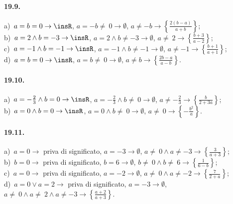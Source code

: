 \paragraph{19.9.}
a)~$a=b=0 \rightarrow \insR$, $a=-b\neq~0 \rightarrow \emptyset$, $a\neq -b \rightarrow \left\{\frac{2(b-a)}{a+b}\right\}$;
\protect\\ b)~$a=2\wedge b=-3 \rightarrow \insR$, $a=2\wedge b\neq -3 \rightarrow \emptyset$, $a\neq~2 \rightarrow \left\{\frac{b+3}{a-2}\right\}$;
\protect\\ c)~$a=-1\wedge b=-1 \rightarrow \insR$, $a=-1\wedge b\neq -1 \rightarrow \emptyset$, $a\neq -1 \rightarrow \left\{\frac{b+1}{a+1}\right\}$;
\protect\\ d)~$a=b=0 \rightarrow \insR$, $a=b\neq~0 \rightarrow \emptyset$, $a\neq b \rightarrow \left\{\frac{2b-a}{a-b}\right\}$.

\paragraph{19.10.}
a)~$a=-{\frac{2}{3}}\wedge b=0 \rightarrow \insR$, $a=-{\frac{2}{3}}\wedge b\neq~0 \rightarrow \emptyset$, $a\neq -{\frac{2}{3}} \rightarrow \left\{\frac{b}{2+3a}\right\}$;
\protect\\ b)~$a=0\wedge b=0 \rightarrow \insR$, $a=0\wedge b\neq~0 \rightarrow \emptyset$, $a\neq~0 \rightarrow \left\{-{\frac{b^{2}}{a}}\right\}$.

\paragraph{19.11.}
a)~$a=0 \rightarrow$ priva di significato, $a=-3 \rightarrow \emptyset$, $a\neq~0\wedge a\neq -3 \rightarrow \left\{\frac{3}{a+3}\right\}$;
\protect\\ b)~$b=0 \rightarrow$ priva di significato, $b=6 \rightarrow \emptyset$, $b\neq~0\wedge b\neq~6 \rightarrow \left\{\frac{1}{6-b}\right\}$;
\protect\\ c)~$a=0 \rightarrow$ priva di significato, $a=-2 \rightarrow \emptyset$, $a\neq~0\wedge a\neq -2 \rightarrow \left\{\frac{7}{2+a}\right\}$;
\protect\\ d)~$a=0\vee a=2 \rightarrow$ priva di significato, $a=-3 \rightarrow \emptyset$, $a\neq~0\wedge a\neq~2\wedge a\neq -3 \rightarrow \left\{\frac{a+2}{a+3}\right\}$.

